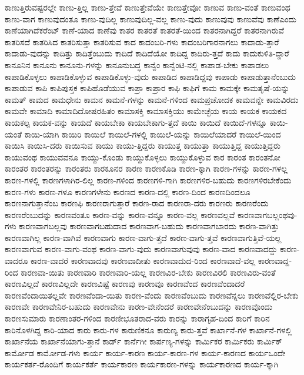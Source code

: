 {ಕಾಣುತ್ತಿರುವಷ್ಟರಲ್ಲೇ
ಕಾಣು-ತ್ತಿಲ್ಲ
ಕಾಣು-ತ್ತೇವೆ
ಕಾಣುತ್ತೇವೆಯೇ
ಕಾಣುತ್ತೇವೋ
ಕಾಣುವ
ಕಾಣು-ವಂತೆ
ಕಾಣುವಂಥ
ಕಾಣು-ವಾಗ
ಕಾಣುವುದಂತೂ
ಕಾಣು-ವುದಿಲ್ಲ
ಕಾಣುವುದಿಲ್ಲ-ವಲ್ಲ
ಕಾಣು-ವುದು
ಕಾಣುವುವು
ಕಾಣುವೆವು
ಕಾಣೆಎಂದು
ಕಾಣೆಯಾಗಿದೆಕರೆಂಟ್
ಕಾಣೆ-ಯಾದ
ಕಾಣೆವು
ಕಾತರ
ಕಾತರತೆ
ಕಾತರತೆ-ಯಿಂದ
ಕಾತರನಾಗಿದ್ದರೆ
ಕಾತರನಾಗಿರುವೆ
ಕಾತರಿಸದೆ
ಕಾತರಿಸಿದ
ಕಾತರಿಸುತ್ತಾ
ಕಾತರಿಸುವ
ಕಾದ
ಕಾದಂಬರಿ-ಗಳು
ಕಾದಂಬರಿಗಾರನಾಗಲು
ಕಾದಾಡು-ತ್ತಾರೆ
ಕಾದಾಡು-ವುದನ್ನು
ಕಾದಿತ್ತು
ಕಾದಿತ್ತೆಂಬುದು
ಕಾದಿದೆ
ಕಾದಿದೆಯೋ
ಕಾದಿದ್ದ
ಕಾದಿರು-ತ್ತದೆ
ಕಾದು
ಕಾದುಕುಳಿತಿ-ದ್ದಾರೆ
ಕಾನೂನಿನ
ಕಾನೂನು
ಕಾನೂನು-ಗಳನ್ನು
ಕಾನೂನುಬದ್ಧ
ಕಾನ್ವೆಂ
ಕಾನ್ವೆಂಟಿ-ನಲ್ಲಿ
ಕಾಪಾಡ-ಬೇಕು
ಕಾಪಾಡಲು
ಕಾಪಾಡಿಕೊಳ್ಳಲು
ಕಾಪಾಡಿಕೊಳ್ಳುವ
ಕಾಪಾಡಿಕೊಳ್ಳು-ವುದು
ಕಾಪಾಡಿದ
ಕಾಪಾಡಿದ್ದವು
ಕಾಪಾಡು
ಕಾಪಾಡುತ್ತಾನೆಂಬುದು
ಕಾಪಾಡುವ
ಕಾಪಿ
ಕಾಪಿಪುಸ್ತಕ
ಕಾಪಿಹೊಡೆಯುವ
ಕಾಪ್ರಾ
ಕಾಪ್ರಾರ
ಕಾಫಿ
ಕಾಫಿಗೆ
ಕಾಮ
ಕಾಮಕ್ಕೇ
ಕಾಮತೃಷೆ-ಯನ್ನು
ಕಾಮತ್
ಕಾಮದ
ಕಾಮಧೇನು
ಕಾಮನ
ಕಾಮನೆ-ಗಳನ್ನು
ಕಾಮನೆ-ಗಳಿಂದ
ಕಾಮಪ್ರಚೋದಕ
ಕಾಮವನ್ನೇ
ಕಾಮವಿರದು
ಕಾಮವೇ
ಕಾಮಾದಿ
ಕಾಮಾದಿದೋಷರಹಿತಂ
ಕಾಮಾಸಕ್ತಿ
ಕಾಮಾಸಕ್ತಿಯು
ಕಾಮೇಚ್ಛೆಯ
ಕಾಯ
ಕಾಯಕ
ಕಾಯಕದ
ಕಾಯಕಲ್ಪ
ಕಾಯಕ-ವನ್ನು
ಕಾಯದೆ
ಕಾಯಬೇಕಾ
ಕಾಯಬೇಕಾಗು-ತ್ತದೆ
ಕಾಯಿ
ಕಾಯಿದೆ
ಕಾಯಿದೆ-ಗಳನ್ನೂ
ಕಾಯಿ-ಯಂತೆ
ಕಾಯಿ-ಯಾಗಿ
ಕಾಯಿರಿ
ಕಾಯಿಲೆ
ಕಾಯಿಲೆ-ಗಳಲ್ಲಿ
ಕಾಯಿಲೆ-ಯನ್ನು
ಕಾಯಿಲೆಯಾದರೆ
ಕಾಯಿಲೆ-ಯಿಂದ
ಕಾಯಿಸಿ
ಕಾಯಿಸಿ-ದರು
ಕಾಯಿಸುವ
ಕಾಯು
ಕಾಯು-ತ್ತಿದ್ದರು
ಕಾಯುತ್ತ
ಕಾಯುತ್ತಾ
ಕಾಯುತ್ತಿದ್ದ
ಕಾಯುತ್ತಿದ್ದರು
ಕಾಯುವಂಥ
ಕಾಯುವವನೂ
ಕಾಯ್ದು-ಕೊಂಡು
ಕಾಯ್ದುಕೊಳ್ಳಲು
ಕಾಯ್ದುಕೊಳ್ಳುವ
ಕಾರ
ಕಾರಂತ
ಕಾರಂತನೋ
ಕಾರಂತರ
ಕಾರಂತರನ್ನು
ಕಾರಂತರು
ಕಾರಕೂನರ
ಕಾರಣ
ಕಾರಣಕೊಡಿ
ಕಾರಣ-ಕ್ಕಾಗಿ
ಕಾರಣ-ಗಳನ್ನು
ಕಾರಣ-ಗಳಲ್ಲ
ಕಾರಣ-ಗಳಲ್ಲಿ
ಕಾರಣಗಳಾಗಿರ-ಲಿಲ್ಲ
ಕಾರಣ-ಗಳಿಂದ
ಕಾರಣಗಳಿ-ಗಾಗಿ
ಕಾರಣಗಳಿರ-ಬಹುದು
ಕಾರಣಗಳಿರಬೇಕೆಂದು
ಕಾರಣ-ಗಳು
ಕಾರಣ-ಗಳೂ
ಕಾರಣಗಳೇನು
ಕಾರಣದ
ಕಾರಣ-ದಲ್ಲಿ
ಕಾರಣ-ದಿಂದ
ಕಾರಣದಿಂದಲೂ
ಕಾರಣನಾಗುತ್ತಾನೆಂಬ
ಕಾರಣಫಿ
ಕಾರಣರಾಗುತ್ತಾರೆ
ಕಾರಣ-ರಾದ
ಕಾರಣರಾ-ದರು
ಕಾರಣರು
ಕಾರಣರೆಂದು
ಕಾರಣರೆಂಬುದನ್ನು
ಕಾರಣವಂತೂ
ಕಾರಣ-ವನ್ನು
ಕಾರಣ-ವನ್ನೂ
ಕಾರಣ-ವಲ್ಲ
ಕಾರಣವಲ್ಲವೆ
ಕಾರಣವಾಗಬಲ್ಲಂಥವು-ಗಳು
ಕಾರಣವಾಗಬಲ್ಲವು
ಕಾರಣವಾಗಬಹುದಾದ
ಕಾರಣವಾಗ-ಬಹುದು
ಕಾರಣವಾಗಬಾರದು
ಕಾರಣ-ವಾಗಿತ್ತು
ಕಾರಣವಾಗಿಲ್ಲ
ಕಾರಣ-ವಾಗಿವೆ
ಕಾರಣವಾಗು
ಕಾರಣ-ವಾಗು-ತ್ತದೆ
ಕಾರಣ-ವಾಗು-ತ್ತವೆ
ಕಾರಣವಾಗುತ್ತಿವೆ-ಯಲ್ಲ
ಕಾರಣವಾಗುವ
ಕಾರಣ-ವಾಗು-ವಂಥ
ಕಾರಣ-ವಾಗು-ವುದು
ಕಾರಣವಾಗುವುವು
ಕಾರಣ-ವಾದ
ಕಾರಣವಾದದ್ದು
ಕಾರಣ-ವಾದರೂ
ಕಾರಣ-ವಾದರೆ
ಕಾರಣವಾದವು
ಕಾರಣವಾದೀತು
ಕಾರಣವಾದುದ-ರಿಂದ
ಕಾರಣವಾದೆ-ವಲ್ಲ
ಕಾರಣವಾದ್ದ-ರಿಂದ
ಕಾರಣವಾ-ಯಿತು
ಕಾರಣವಾರಿ
ಕಾರಣವಾರಿ-ಯಲ್ಲ
ಕಾರಣವಿರ-ಬೇಕು
ಕಾರಣವಿರಲಿ
ಕಾರಣವಿರು-ವಂತೆ
ಕಾರಣವಿಲ್ಲದೆ
ಕಾರಣವಿಲ್ಲದೇ
ಕಾರಣವಿಷ್ಟೆ
ಕಾರಣವು
ಕಾರಣವೂ
ಕಾರಣವೆಂದ
ಕಾರಣವೆಂದಾದರೆ
ಕಾರಣವೆಂದಾಯಿತಲ್ಲವೇ
ಕಾರಣವೆಂದಾ-ಯಿತು
ಕಾರಣ-ವೆಂದು
ಕಾರಣವೆಂಬುದು
ಕಾರಣವೆನ್ನಲು
ಕಾರಣವೆಲ್ಲಿರ-ಬೇಕು
ಕಾರಣವೇ
ಕಾರಣವೇನಿರ-ಬಹುದು
ಕಾರಣವೇನು
ಕಾರಣ-ವೇನೆಂದರೆ
ಕಾರಣವೇನೆಂಬುದನ್ನು
ಕಾರಣವೊಂದು
ಕಾರಣಸುಮಾರು
ಕಾರಣಾಂತರ-ಗಳಿಂದ
ಕಾರಣೀಭೂತರಾದ-ವರು
ಕಾರನ್ನು
ಕಾರಾಗೃಹ-ದಿಂದ
ಕಾರಿಗೆ
ಕಾರಿನ
ಕಾರಿನೊಳಗಿದ್ದ
ಕಾರಿ-ಯಾದ
ಕಾರು
ಕಾರು-ಗಳ
ಕಾರುಣಿಕನೂ
ಕಾರುಣ್ಯ
ಕಾರು-ತ್ತವೆ
ಕಾರ್ಖಾನೆ-ಗಳ
ಕಾರ್ಖಾನೆ-ಗಳಲ್ಲಿ
ಕಾರ್ಖಾನೆಯ
ಕಾರ್ಖಾನೆಯಾಗು-ತ್ತಾನೆ
ಕಾರ್ಡ್
ಕಾರ್ನೆಗೀ
ಕಾರ್ಪಣ್ಯ-ಗಳನ್ನು
ಕಾರ್ಮಿಕರ
ಕಾರ್ಮಿಕರು
ಕಾರ್ಮಿಕ್
ಕಾರ್ಮೋಡ
ಕಾರ್ಮೋಡ-ಗಳು
ಕಾರ್ಯ
ಕಾರ್ಯ-ಕಾರಣ
ಕಾರ್ಯ-ಕಾರಣ-ಗಳ
ಕಾರ್ಯ-ಕಾರಣದ
ಕಾರ್ಯಒಂದೇ
ಕಾರ್ಯಕರ್ತ-ರೊಂದಿಗೆ
ಕಾರ್ಯಕರ್ತೆ
ಕಾರ್ಯಕಾರಣ
ಕಾರ್ಯಕಾರಣ-ಗಳನ್ನು
ಕಾರ್ಯಕಾರಣದ
ಕಾರ್ಯ-ಕ್ಕಾಗಿ
}
